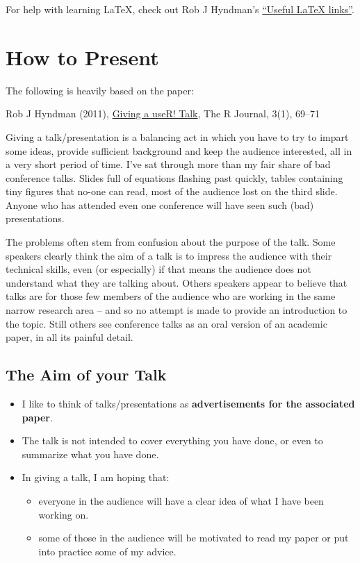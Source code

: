 \documentclass[
]{book}
\providecommand{\tightlist}{%
  \setlength{\itemsep}{0pt}\setlength{\parskip}{0pt}}
\begin{document}
For help with learning LaTeX, check out Rob J Hyndman's \href{https://robjhyndman.com/hyndsight/useful-latex-links/}{``Useful LaTeX links''}.

\hypertarget{how-to-present}{%
\chapter{How to Present}\label{how-to-present}}

The following is heavily based on the paper:

Rob J Hyndman (2011), \href{https://journal.r-project.org/archive/2011-1/RJournal_2011-1_Hyndman.pdf}{Giving a useR! Talk}, The R Journal, 3(1), 69--71

\hfill\break

Giving a talk/presentation is a balancing act in which you have to try to impart some ideas, provide sufficient background and keep the audience interested, all in a very short period of time. I've sat through more than my fair share of bad conference talks. Slides full of equations flashing past quickly, tables containing tiny figures that no-one can read, most of the audience lost on the third slide. Anyone who has attended even one conference will have seen such (bad) presentations.

The problems often stem from confusion about the
purpose of the talk. Some speakers clearly think the
aim of a talk is to impress the audience with their
technical skills, even (or especially) if that means the
audience does not understand what they are talking
about. Others speakers appear to believe that talks
are for those few members of the audience who are
working in the same narrow research area -- and so
no attempt is made to provide an introduction to the
topic. Still others see conference talks as an oral version
of an academic paper, in all its painful detail.

\hypertarget{the-aim-of-your-talk}{%
\section{The Aim of your Talk}\label{the-aim-of-your-talk}}

\begin{itemize}
\tightlist
\item
  I like to think of talks/presentations as \textbf{advertisements for the associated paper}.
\item
  The talk is not intended to cover everything you have done, or even to summarize what you have done.
\item
  In giving a talk, I am hoping that:

  \begin{itemize}
  \tightlist
  \item
    everyone in the audience will have a clear idea of what I have been working on.
  \item
    some of those in the audience will be motivated to read my paper or put into practice some of my advice.
  \end{itemize}
\end{itemize}
\end{document}
